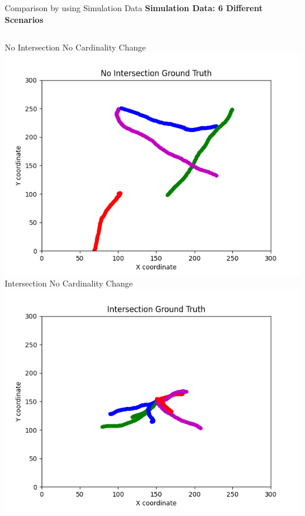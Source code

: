 \documentclass[12pt]{beamer}
\begin{document}
\begin{frame}{Comparison by using Simulation Data}
\textbf{Simulation Data: 6 Different Scenarios}
\begin{columns}[t]
  \begin{column}{0.333\linewidth}
      \centering
      \scriptsize No Intersection No Cardinality Change\\
      \includegraphics[width=\linewidth,height=0.32\textheight,keepaspectratio]{ground_truth/No Intersection_track.png}\\
      \scriptsize Intersection No Cardinality Change\\
      \includegraphics[width=\linewidth,height=0.32\textheight,keepaspectratio]{ground_truth/Intersection_track.png}\\

\end{column}
\end{columns}
\end{frame}
\end{document}

